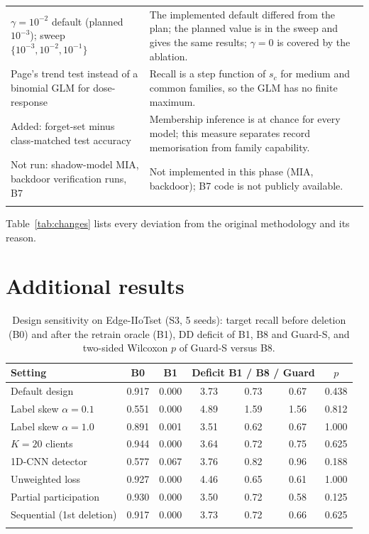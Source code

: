 \documentclass[pdflatex,sn-mathphys-num,iicol]{sn-jnl}
\begin{document}
\begin{appendices}
\begin{table}[!htbp]
\begin{tabular*}{\textwidth}{@{\extracolsep\fill}>{\raggedright\arraybackslash}p{4.6cm}>{\raggedright\arraybackslash}p{10.8cm}@{}}
$\gamma=10^{-2}$ default (planned $10^{-3}$); sweep $\{10^{-3},10^{-2},10^{-1}\}$ & The implemented default differed from the plan; the planned value is in the sweep and gives the same results; $\gamma=0$ is covered by the ablation. \\
Page's trend test instead of a binomial GLM for dose-response & Recall is a step function of $s_c$ for medium and common families, so the GLM has no finite maximum. \\
Added: forget-set minus class-matched test accuracy & Membership inference is at chance for every model; this measure separates record memorisation from family capability. \\
Not run: shadow-model MIA, backdoor verification runs, B7 & Not implemented in this phase (MIA, backdoor); B7 code is not publicly available. \\
\botrule
\end{tabular*}
\end{table}

Table~\ref{tab:changes} lists every deviation from the original methodology and its reason.

\FloatBarrier
\section{Additional results}\label{app:tables}

\begin{table}[!htbp]
\caption{Design sensitivity on Edge-IIoTset (S3, 5 seeds): target recall before deletion (B0) and after the retrain oracle (B1), DD deficit of B1, B8 and Guard-S, and two-sided Wilcoxon $p$ of Guard-S versus B8.}\label{tab:pass3}
\scriptsize
\setlength{\tabcolsep}{2pt}
\begin{tabular*}{\textwidth}{@{\extracolsep\fill}lcccccc}
\toprule
Setting & B0 & B1 & \multicolumn{3}{c}{Deficit B1 / B8 / Guard} & $p$ \\
\midrule
Default design & 0.917 & 0.000 & 3.73 & 0.73 & 0.67 & 0.438 \\
Label skew $\alpha=0.1$ & 0.551 & 0.000 & 4.89 & 1.59 & 1.56 & 0.812 \\
Label skew $\alpha=1.0$ & 0.891 & 0.001 & 3.51 & 0.62 & 0.67 & 1.000 \\
$K=20$ clients & 0.944 & 0.000 & 3.64 & 0.72 & 0.75 & 0.625 \\
1D-CNN detector & 0.577 & 0.067 & 3.76 & 0.82 & 0.96 & 0.188 \\
Unweighted loss & 0.927 & 0.000 & 4.46 & 0.65 & 0.61 & 1.000 \\
Partial participation & 0.930 & 0.000 & 3.50 & 0.72 & 0.58 & 0.125 \\
Sequential (1st deletion) & 0.917 & 0.000 & 3.73 & 0.72 & 0.66 & 0.625 \\
\botrule
\end{tabular*}
\end{table}


\end{appendices}
\end{document}
